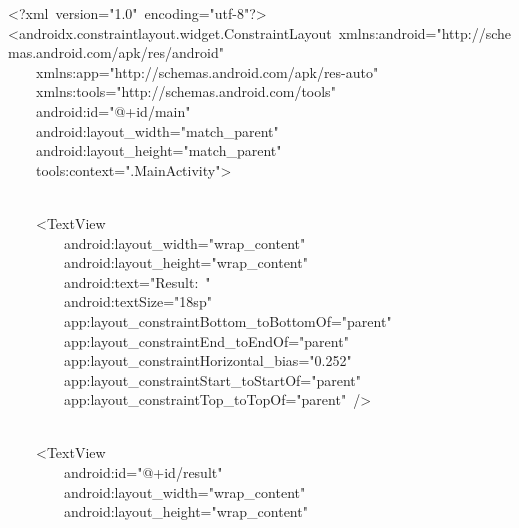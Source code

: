 {\ttfamily\small \textless{}?xml\ version="1.0"\ encoding="utf-8"?\textgreater{}} \\
{\ttfamily\small \textless{}androidx.constraintlayout.widget.ConstraintLayout\ xmlns:android="http://schemas.android.com/apk/res/android"} \\
{\ttfamily\small \ \ \ \ xmlns:app="http://schemas.android.com/apk/res-auto"} \\
{\ttfamily\small \ \ \ \ xmlns:tools="http://schemas.android.com/tools"} \\
{\ttfamily\small \ \ \ \ android:id="@+id/main"} \\
{\ttfamily\small \ \ \ \ android:layout\_width="match\_parent"} \\
{\ttfamily\small \ \ \ \ android:layout\_height="match\_parent"} \\
{\ttfamily\small \ \ \ \ tools:context=".MainActivity"\textgreater{}} \\
\strut \\
{\ttfamily\small \ \ \ \ \textless{}TextView} \\
{\ttfamily\small \ \ \ \ \ \ \ \ android:layout\_width="wrap\_content"} \\
{\ttfamily\small \ \ \ \ \ \ \ \ android:layout\_height="wrap\_content"} \\
{\ttfamily\small \ \ \ \ \ \ \ \ android:text="Result:\ "} \\
{\ttfamily\small \ \ \ \ \ \ \ \ android:textSize="18sp"} \\
{\ttfamily\small \ \ \ \ \ \ \ \ app:layout\_constraintBottom\_toBottomOf="parent"} \\
{\ttfamily\small \ \ \ \ \ \ \ \ app:layout\_constraintEnd\_toEndOf="parent"} \\
{\ttfamily\small \ \ \ \ \ \ \ \ app:layout\_constraintHorizontal\_bias="0.252"} \\
{\ttfamily\small \ \ \ \ \ \ \ \ app:layout\_constraintStart\_toStartOf="parent"} \\
{\ttfamily\small \ \ \ \ \ \ \ \ app:layout\_constraintTop\_toTopOf="parent"\ /\textgreater{}} \\
\strut \\
{\ttfamily\small \ \ \ \ \textless{}TextView} \\
{\ttfamily\small \ \ \ \ \ \ \ \ android:id="@+id/result"} \\
{\ttfamily\small \ \ \ \ \ \ \ \ android:layout\_width="wrap\_content"} \\
{\ttfamily\small \ \ \ \ \ \ \ \ android:layout\_height="wrap\_content"} \\
